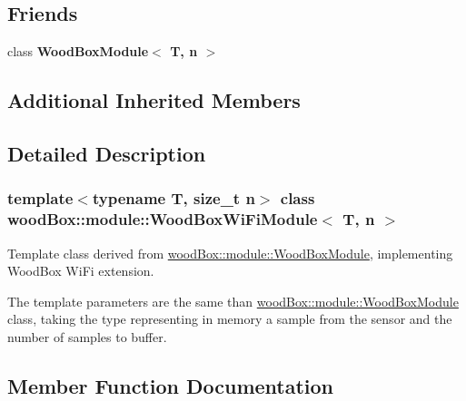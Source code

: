 \subsection*{Friends}
\begin{DoxyCompactItemize}
\item 
\mbox{\label{classwood_box_1_1module_1_1_wood_box_wi_fi_module_a63a1b80c5bfd6525d93f1b3dc9dab20b}} 
class {\bfseries Wood\+Box\+Module$<$ T, n $>$}
\end{DoxyCompactItemize}
\subsection*{Additional Inherited Members}


\subsection{Detailed Description}
\subsubsection*{template$<$typename T, size\+\_\+t n$>$\newline
class wood\+Box\+::module\+::\+Wood\+Box\+Wi\+Fi\+Module$<$ T, n $>$}

Template class derived from \mbox{\hyperlink{classwood_box_1_1module_1_1_wood_box_module}{wood\+Box\+::module\+::\+Wood\+Box\+Module}}, implementing Wood\+Box Wi\+Fi extension.

The template parameters are the same than \mbox{\hyperlink{classwood_box_1_1module_1_1_wood_box_module}{wood\+Box\+::module\+::\+Wood\+Box\+Module}} class, taking the type representing in memory a sample from the sensor and the number of samples to buffer. 

\subsection{Member Function Documentation}
\mbox{\label{classwood_box_1_1module_1_1_wood_box_wi_fi_module_ad1fa85749c0e194c9e589261dfb2433d}} 
